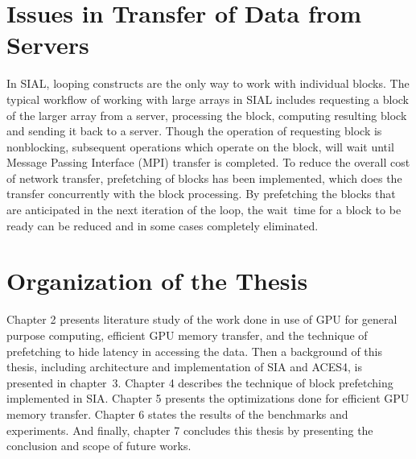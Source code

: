 \section{Issues in Transfer of Data from Servers}
In SIAL, looping constructs are the only way to work with individual blocks.
The typical workflow of working with large arrays in SIAL includes requesting a
block of the larger array from a server,
processing the block, computing resulting block and sending it back to a server. Though
the operation of requesting block is nonblocking, subsequent operations
which operate on the block, will wait until Message Passing Interface (MPI)
transfer is completed. To reduce the overall cost of network
transfer, prefetching of blocks has been implemented, which does the transfer concurrently
with the block processing. By prefetching the blocks that are anticipated in
the next iteration of the loop, the wait~time for a block to be ready
can be reduced and in some cases completely eliminated.

\section{Organization of the Thesis}
Chapter 2 presents literature study of the work done in use of GPU for general purpose
computing, efficient GPU memory transfer, and the technique of prefetching to hide
latency in accessing the data. Then a background of this thesis, including architecture
and implementation of SIA and ACES4, is presented in chapter~3.
Chapter 4 describes the technique of block prefetching implemented in SIA. Chapter 5
presents the optimizations done for efficient GPU memory transfer. Chapter 6 states the
results of the benchmarks and experiments. And
finally, chapter 7 concludes this thesis by presenting the conclusion and scope
of future works.
